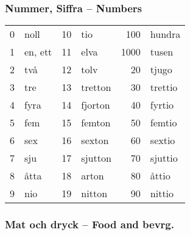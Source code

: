 \documentclass[14pt]{refcard} %
\begin{document}
\pagebreak

\subsubsection{Nummer, Siffra -- Numbers}
\vspace{-1ex}
\begin{tabular}{rl rl rl}
0 & noll    &  10 & tio             &  100 & hundra           \\
1 & en, ett &  11 & elva            & 1000 & tusen            \\
2 & två     &  12 & tolv            &   20 & tjugo            \\
3 & tre     &  13 & tretton         &   30 & trettio          \\
4 & fyra    &  14 & fjorton         &   40 & fyrtio           \\
5 & fem     &  15 & femton          &   50 & femtio           \\
6 & sex     &  16 & sexton          &   60 & sextio           \\
7 & sju     &  17 & sjutton         &   70 & sjuttio          \\
8 & åtta    &  18 & arton           &   80 & åttio            \\
9 & nio     &  19 & nitton          &   90 & nittio           \\
\end{tabular}


\pagebreak

\subsubsection{Mat och dryck -- Food and bevrg.}
\end{document}
